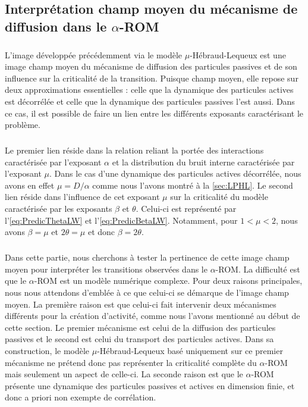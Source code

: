 \subsection{Interprétation champ moyen du mécanisme de diffusion dans le $\alpha$-ROM}

\subparagraph{}L'image développée précédemment via le modèle $\mu$-Hébraud-Lequeux est une image champ moyen du mécanisme de diffusion des particules passives et de son influence sur la criticalité de la transition. Puisque champ moyen, elle repose sur deux approximations essentielles : celle que la dynamique des particules actives est décorrélée et celle que la dynamique des particules passives l'est aussi. Dans ce cas, il est possible de faire un lien entre les différents exposants caractérisant le problème.

\subparagraph{}Le premier lien réside dans la relation reliant la portée des interactions caractérisée par l'exposant $\alpha$ et la distribution du bruit interne caractérisée par l'exposant $\mu$. Dans le cas d'une dynamique des particules actives décorrélée, nous avons en effet $\mu = D/\alpha$ comme nous l'avons montré à la \autoref{sec:LPHL}. Le second lien réside dans l'influence de cet exposant $\mu$ sur la criticalité du modèle caractérisée par les exposants $\beta$ et $\theta$. Celui-ci est représenté par l'\autoref{eq:PredicThetaLW} et l'\autoref{eq:PredicBetaLW}. Notamment, pour $1<\mu<2$, nous avons $\beta = \mu$ et $2\theta = \mu$ et donc $\beta = 2\theta$. 

\subparagraph{}Dans cette partie, nous cherchons à tester la pertinence de cette image champ moyen pour interpréter les transitions observées dans le $\alpha$-ROM. La difficulté est que le $\alpha$-ROM est un modèle numérique complexe. Pour deux raisons principales, nous nous attendons d'emblée à ce que celui-ci se démarque de l'image champ moyen. La première raison est que celui-ci fait intervenir deux mécanismes différents pour la création d'activité, comme nous l'avons mentionné au début de cette section. Le premier mécanisme est celui de la diffusion des particules passives et le second est celui du transport des particules actives. Dans sa construction, le modèle $\mu$-Hébraud-Lequeux basé uniquement sur ce premier mécanisme ne prétend donc pas représenter la criticalité complète du $\alpha$-ROM mais seulement un aspect de celle-ci. La seconde raison est que le $\alpha$-ROM présente une dynamique des particules passives et actives en dimension finie, et donc a priori non exempte de corrélation. 

